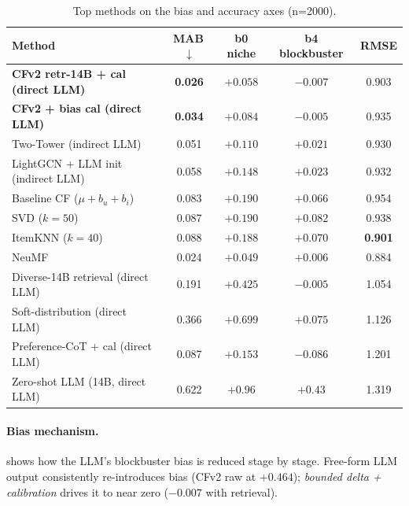 \documentclass[11pt,a4paper]{article}
\newcommand{\best}[1]{\textcolor{goodgreen}{\textbf{#1}}}
\begin{document}
\begin{table}[H]
\centering\small
\caption{Top methods on the bias and accuracy axes (n=2000).}
\label{tab:compact_bias}
\begin{tabularx}{\linewidth}{Xcccc}
\toprule
Method & MAB\,$\downarrow$ & b0 niche & b4 blockbuster & RMSE \\ \midrule
\rowcolor{goodgreen!15}
\textbf{CFv2 retr-14B + cal (direct LLM)} & \best{0.026} & $+0.058$ & $-0.007$ & 0.903 \\
\rowcolor{goodgreen!15}
\textbf{CFv2 + bias cal (direct LLM)}      & \best{0.034} & $+0.084$ & $-0.005$ & 0.935 \\
Two-Tower (indirect LLM)                   & 0.051        & $+0.110$ & $+0.021$ & 0.930 \\
LightGCN + LLM init (indirect LLM)         & 0.058        & $+0.148$ & $+0.023$ & 0.932 \\
Baseline CF ($\mu{+}b_u{+}b_i$)            & 0.083        & $+0.190$ & $+0.066$ & 0.954 \\
SVD ($k{=}50$)                             & 0.087        & $+0.190$ & $+0.082$ & 0.938 \\
ItemKNN ($k{=}40$)                         & 0.088        & $+0.188$ & $+0.070$ & \best{0.901} \\
NeuMF                                       & 0.024        & $+0.049$ & $+0.006$ & 0.884 \\
Diverse-14B retrieval (direct LLM)         & 0.191        & $+0.425$ & $-0.005$ & 1.054 \\
Soft-distribution (direct LLM)             & 0.366        & $+0.699$ & $+0.075$ & 1.126 \\
Preference-CoT + cal (direct LLM)          & 0.087        & $+0.153$ & $-0.086$ & 1.201 \\
Zero-shot LLM (14B, direct LLM)            & 0.622        & $+0.96$  & $+0.43$  & 1.319 \\
\bottomrule
\end{tabularx}
\end{table}

\paragraph{Bias mechanism.}
 shows how the LLM's blockbuster
bias is reduced stage by stage. Free-form LLM output consistently
re-introduces bias (CFv2 raw at $+0.464$); \emph{bounded delta + calibration}
drives it to near zero ($-0.007$ with retrieval).
\end{document}
